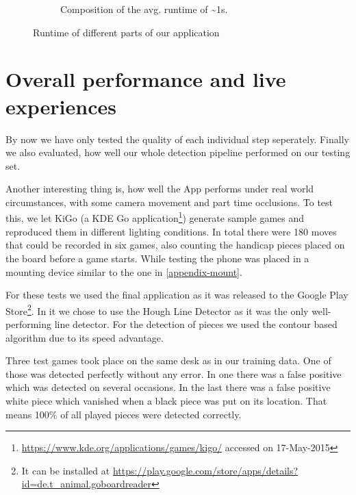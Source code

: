 \begin{figure}
\begin{subfigure}{0.25\textwidth}
\begin{tikzpicture}
			\end{tikzpicture}
			\vspace{1.5em}
			\caption{Composition of the avg. runtime of \textasciitilde1s.}
			\label{fig:timeEvaluation-pie}
		\end{subfigure}

		\caption{Runtime of different parts of our application}
		\label{fig:timeEvaluation}
	\end{figure}




	\section{Overall performance and live experiences}
	\label{evaluation-overallPerformance}
	By now we have only tested the quality of each individual step seperately. Finally we also evaluated, how well our whole detection pipeline performed on our testing set.


	Another interesting thing is, how well the App performs under real world circumstances, with some camera movement and part time occlusions. To test this, we let KiGo (a KDE Go application\footnote{\url{https://www.kde.org/applications/games/kigo/} accessed on 17-May-2015}) generate sample games and reproduced them in different lighting conditions. In total there were 180 moves that could be recorded in six games, also counting the handicap pieces placed on the board before a game starts. While testing the phone was placed in a mounting device similar to the one in \autoref{appendix-mount}.

	For these tests we used the final application as it was released to the Google Play Store\footnote{It can be installed at \url{https://play.google.com/store/apps/details?id=de.t_animal.goboardreader}}. In it we chose to use the Hough Line Detector as it was the only well-performing line detector. For the detection of pieces we used the contour based algorithm due to its speed advantage.

	Three test games took place on the same desk as in our training data. One of those was detected perfectly without any error. In one there was a false positive which was detected on several occasions. In the last there was a false positive white piece which vanished when a black piece was put on its location. That means 100\% of all played pieces were detected correctly.

